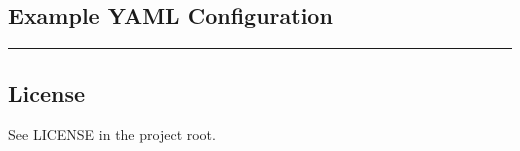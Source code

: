 \subsection{Example YAML
Configuration}\label{example-yaml-configuration}

\begin{Shaded}
\begin{Highlighting}[]
\KeywordTok{:}
\AttributeTok{  }\KeywordTok{:}
\AttributeTok{  }\KeywordTok{:}
\end{Highlighting}
\end{Shaded}

\begin{center}\rule{0.5\linewidth}{0.5pt}\end{center}

\subsection{License}\label{license}

See LICENSE in the project root.
